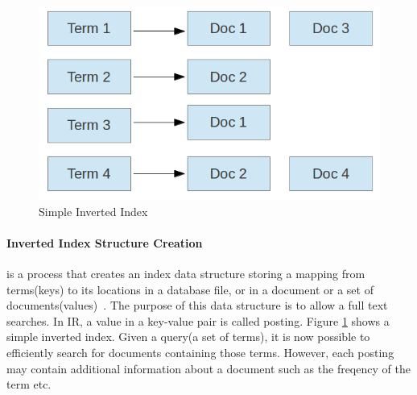 \begin{figure}
\centering
\includegraphics[scale=0.5]{./figures/invertedIndex.png}
\caption{Simple Inverted Index} \label{fig:invertedIndex} 
\end{figure}

\paragraph{Inverted Index Structure Creation} is a process that creates an index data structure storing a mapping from terms(keys) to its 
locations in a database file, or in a document or a set of documents(values)~\cite{invertedindex}. 
The purpose of this data structure is to allow a full text searches. In IR, a value in a key-value pair is called posting. 
Figure \ref{fig:invertedIndex} shows a simple inverted index. Given a query(a set of terms), it is now possible to efficiently search for
documents containing those terms. However, each posting may contain additional information about a document such as the freqency of the term etc.

